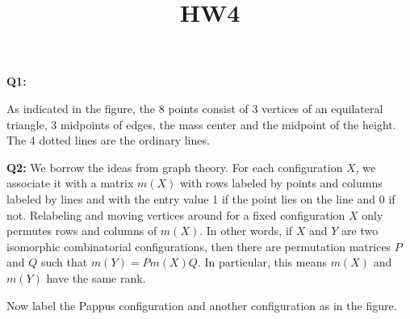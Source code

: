 \documentclass[12pt,reqno]{amsart}
\theoremstyle{definition}
\begin{document}
\title{HW4}

\noindent \textbf{Q1:}

\begin{center}
\end{center}


As indicated in the figure, the 8 points consist of 3 vertices of an equilateral triangle, 3 midpoints of edges, the mass center and the midpoint of the height. The 4 dotted lines are the ordinary lines.

\newpage
\noindent \textbf{Q2:} We borrow the ideas from graph theory. For each configuration $X$, we associate it with a matrix $m(X)$ with rows labeled by points and columns labeled by lines and with the entry value 1 if the point lies on the line and 0 if not. Relabeling and moving vertices around for a fixed configuration $X$ only permutes rows and columns of $m(X)$. In other words, if $X$ and $Y$ are two isomorphic combinatorial configurations, then there are permutation matrices $P$ and $Q$ such that $m(Y)=P m(X)Q$. In particular, this means $m(X)$ and $m(Y)$ have the same rank.

Now label the Pappus configuration and another configuration as in the figure.
\end{document}
